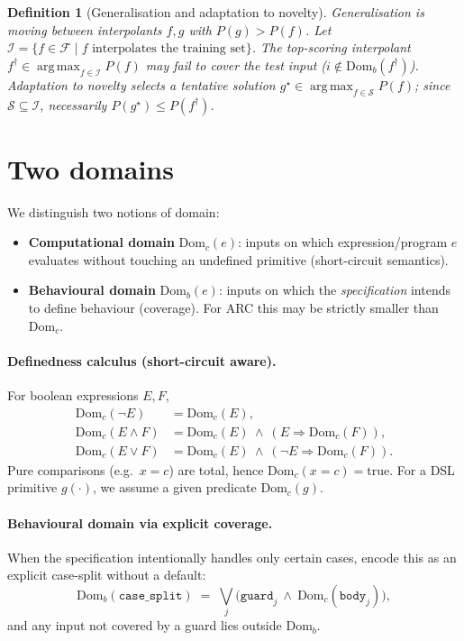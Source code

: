 \documentclass[11pt]{article}
\newtheorem{definition}{Definition}
\newcommand{\F}{\mathcal{F}}
\newcommand{\Domc}{\mathrm{Dom}_c}
\newcommand{\Domb}{\mathrm{Dom}_b}
\DeclareMathOperator*{\argmax}{arg\,max}
\begin{document}
\begin{definition}[Generalisation and adaptation to novelty]
\emph{Generalisation} is moving between interpolants $f,g$ with $P(g)>P(f)$. Let $\mathcal{I}=\{f\in\F\mid f \text{ interpolates the training set}\}$. The top-scoring interpolant $f^\dagger\in\argmax_{f\in\mathcal{I}}P(f)$ may fail to cover the test input ($i\notin\Domb(f^\dagger)$). \emph{Adaptation to novelty} selects a tentative solution $g^\star\in\argmax_{f\in\mathcal{S}}P(f)$; since $\mathcal{S}\subseteq\mathcal{I}$, necessarily $P(g^\star)\le P(f^\dagger)$.
\end{definition}

\section{Two domains}

We distinguish two notions of domain:
\begin{itemize}[leftmargin=1.5em]
\item \textbf{Computational domain} $\Domc(e)$: inputs on which expression/program $e$ evaluates without touching an undefined primitive (short-circuit semantics).
\item \textbf{Behavioural domain} $\Domb(e)$: inputs on which the \emph{specification} intends to define behaviour (coverage). For ARC this may be strictly smaller than $\Domc$.
\end{itemize}

\paragraph{Definedness calculus (short-circuit aware).}
For boolean expressions $E,F$,
\begin{align}
\Domc(\lnot E) &= \Domc(E), \label{eq:not}\\
\Domc(E\land F) &= \Domc(E)\ \land\ (E \Rightarrow \Domc(F)), \label{eq:and}\\
\Domc(E\lor F) &= \Domc(E)\ \land\ (\lnot E \Rightarrow \Domc(F)). \label{eq:or}
\end{align}
Pure comparisons (e.g.\ $x{=}c$) are total, hence $\Domc(x{=}c)=\text{true}$. For a DSL primitive $g(\cdot)$, we assume a given predicate $\Domc(g)$.

\paragraph{Behavioural domain via explicit coverage.}
When the specification intentionally handles only certain cases, encode this as an explicit case-split without a default:
\[
\Domb(\texttt{case\_split}) \;=\; \bigvee_j \bigl(\texttt{guard}_j \ \land\ \Domc(\texttt{body}_j)\bigr),
\]
and any input not covered by a guard lies outside $\Domb$.
\end{document}
